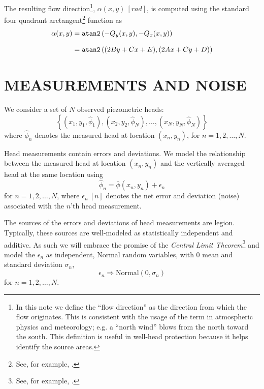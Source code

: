 \documentclass[12pt]{article}
\begin{document}
The resulting flow direction\footnote{In this note we define the ``flow direction'' as the direction from which the flow originates. This is consistent with the usage of the term in atmospheric physics and meteorology; e.g. a ``north wind'' blows from the north toward the south.  This definition is useful in well-head protection because it helps identify the source areas.}, $\alpha(x,y)~[rad]$, is computed using the standard four quadrant arctangent\footnote{See, for example, \cite{wiki:atan2}.} function as
%
\begin{align}\label{2.11}
    \alpha(x,y)
    &= \text{\tt atan2}\left(-Q_y(x,y), -Q_x(x,y)\right) \nonumber\\[8pt]
    &= \text{\tt atan2}\left((2By + Cx + E), (2Ax + Cy + D)\right)
\end{align}


\section{MEASUREMENTS AND NOISE}
We consider a set of $N$ observed piezometric heads:
%
\begin{equation}\label{3.1}
	\left\{ (x_1,y_1,\hat{\phi}_1), (x_2,y_2,\hat{\phi}_N), \ldots, (x_N,y_N,\hat{\phi}_N) \right\}
\end{equation}
%
where $\hat{\phi}_n$ denotes the measured head at location $(x_n,y_n)$, for $n = 1, 2, \ldots, N$.

Head measurements contain errors and deviations.  We model the relationship between the measured head at location $(x_n, y_n)$ and the vertically averaged head at the same location using
%
\begin{equation}\label{3.2}
	\hat{\phi}_n = \bar{\phi}(x_n, y_n) + \epsilon_n
\end{equation}
%
for $n = 1, 2, \ldots, N$, where $\epsilon_n~[n]$ denotes the net error and deviation (noise) associated with the $n$'th head measurement.

The sources of the errors and deviations of head measurements are legion.  Typically, these sources are well-modeled as statistically independent and additive.  As such we will embrace the promise of the {\em Central Limit Theorem}\footnote{See, for example, \citet{wiki:clt}.} and model the $\epsilon_n$ as independent, Normal random variables, with $0$ mean and standard deviation $\sigma_n$,
%
\begin{equation}\label{3.3}
    \epsilon_n \Rightarrow \text{Normal}(0, \sigma_n)
\end{equation}
%
for $n=1,2,\ldots,N$.
\end{document}
